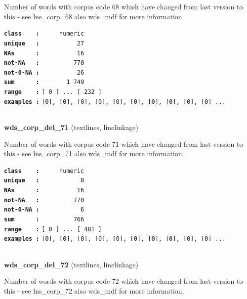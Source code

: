 \documentclass[]{article}
\begin{document}
Number of words with corpus code 68 which have changed from last version
to this - see lns\_corp\_68 also wds\_mdf for more information.

\textbf{\texttt{class\ \ \ \ :}} \texttt{~~~~~numeric}\\
\textbf{\texttt{unique\ \ \ :}} \texttt{~~~~~~~~~~27}\\
\textbf{\texttt{NAs\ \ \ \ \ \ :}} \texttt{~~~~~~~~~~16}\\
\textbf{\texttt{not-NA\ \ \ :}} \texttt{~~~~~~~~~770}\\
\textbf{\texttt{not-0-NA\ :}} \texttt{~~~~~~~~~~26}\\
\textbf{\texttt{sum\ \ \ \ \ \ :}} \texttt{~~~~~~~1~749}\\
\textbf{\texttt{range\ \ \ \ :}}
\texttt{{[}\ 0\ {]}\ ...\ {[}\ 232\ {]}}\\
\textbf{\texttt{examples\ :}}
\texttt{{[}0{]},\ {[}0{]},\ {[}0{]},\ {[}0{]},\ {[}0{]},\ {[}0{]},\ {[}0{]},\ {[}0{]},\ {[}0{]},\ {[}0{]}\ ...}\\

~

\textbf{wds\_corp\_del\_71} (textlines, linelinkage)

Number of words with corpus code 71 which have changed from last version
to this - see lns\_corp\_71 also wds\_mdf for more information.

\textbf{\texttt{class\ \ \ \ :}} \texttt{~~~~~numeric}\\
\textbf{\texttt{unique\ \ \ :}} \texttt{~~~~~~~~~~~8}\\
\textbf{\texttt{NAs\ \ \ \ \ \ :}} \texttt{~~~~~~~~~~16}\\
\textbf{\texttt{not-NA\ \ \ :}} \texttt{~~~~~~~~~770}\\
\textbf{\texttt{not-0-NA\ :}} \texttt{~~~~~~~~~~~6}\\
\textbf{\texttt{sum\ \ \ \ \ \ :}} \texttt{~~~~~~~~~766}\\
\textbf{\texttt{range\ \ \ \ :}}
\texttt{{[}\ 0\ {]}\ ...\ {[}\ 481\ {]}}\\
\textbf{\texttt{examples\ :}}
\texttt{{[}0{]},\ {[}0{]},\ {[}0{]},\ {[}0{]},\ {[}0{]},\ {[}0{]},\ {[}0{]},\ {[}0{]},\ {[}0{]},\ {[}0{]}\ ...}\\

~

\textbf{wds\_corp\_del\_72} (textlines, linelinkage)

Number of words with corpus code 72 which have changed from last version
to this - see lns\_corp\_72 also wds\_mdf for more information.
\end{document}
